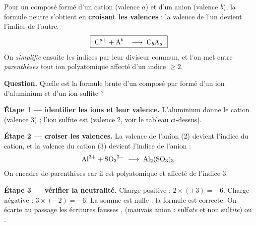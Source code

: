 \documentclass[11pt,a4paper]{article}
\begin{document}
\begin{regle}
Pour un composé formé d'un cation  (valence $a$) et d'un anion  (valence $b$),
la formule neutre s'obtient en \textbf{croisant les valences} : la valence de l'un devient l'indice de
l'autre.
\[ \boxed{\ \ce{C^{$a$+}} + \ce{A^{$b$-}} \;\longrightarrow\; \ce{C_{$b$}A_{$a$}}\ } \]
On \emph{simplifie} ensuite les indices par leur diviseur commun, et l'on met entre \emph{parenthèses}
tout ion polyatomique affecté d'un indice $\geq 2$.
\end{regle}

\begin{center}
\end{center}

\begin{exemple}
\textbf{Question.} Quelle est la formule brute d'un composé pur formé d'un ion d'aluminium et d'un ion
sulfite ?

\smallskip
\textbf{Étape 1 — identifier les ions et leur valence.} L'aluminium donne le cation 
(valence 3) ; l'ion sulfite est  (valence 2, voir le tableau ci-dessus).

\textbf{Étape 2 — croiser les valences.} La valence de l'anion (2) devient l'indice du cation, et la
valence du cation (3) devient l'indice de l'anion :
\[ \ce{Al^3+} + \ce{SO3^2-} \;\longrightarrow\; \ce{Al2(SO3)3}. \]
On encadre  de parenthèses car il est polyatomique et affecté de l'indice 3.

\textbf{Étape 3 — vérifier la neutralité.} Charge positive : $2 \times (+3) = +6$. Charge négative :
$3 \times (-2) = -6$. La somme est nulle : la formule  est correcte. On écarte au passage
les écritures fausses ,  (mauvais anion : sulf\emph{ate} et non sulf\emph{ite})
ou .
\end{exemple}
\end{document}
